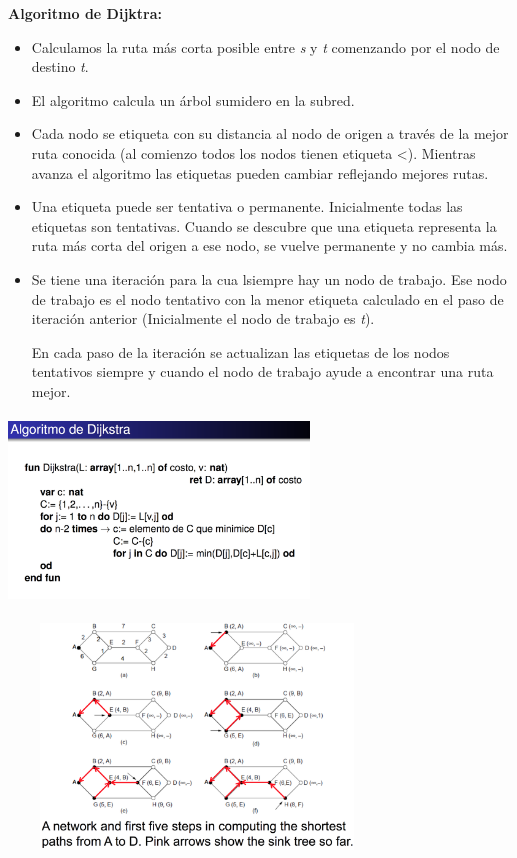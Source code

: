 	\par \textbf{Algoritmo de Dijktra:}
		\begin{itemize}
			\item Calculamos la ruta más corta posible entre \emph{s} y \emph{t}
			comenzando por el nodo de destino \emph{t}.
			\item El algoritmo calcula un árbol sumidero en la subred.
			\item Cada nodo se etiqueta con su distancia al nodo de origen a través de la 	
			mejor ruta conocida (al comienzo todos los nodos tienen etiqueta <). Mientras 
			avanza el algoritmo las etiquetas pueden cambiar reflejando mejores rutas.
 			\item Una etiqueta puede ser tentativa o permanente. Inicialmente todas las 
 			etiquetas son tentativas. Cuando se descubre que una etiqueta representa la 
 			ruta más corta del origen a ese nodo, se vuelve permanente y no cambia más.
			\item Se tiene una iteración para la cua lsiempre hay un nodo de trabajo. Ese 
			nodo de trabajo es el nodo tentativo con la menor etiqueta calculado en el paso 
			de iteración anterior (Inicialmente el nodo de trabajo es \emph{t}).
			
			En cada paso de la iteración se actualizan las etiquetas de los nodos tentativos 
			siempre y cuando el nodo de trabajo ayude a encontrar una ruta mejor.
		\end{itemize}

	\begin{center}
	\includegraphics[width=8cm, height=5cm]{./imagenes/dijktra.png} 

	\includegraphics[width=10cm, height=6cm]{./imagenes/caminos.png}
	\end{center}


